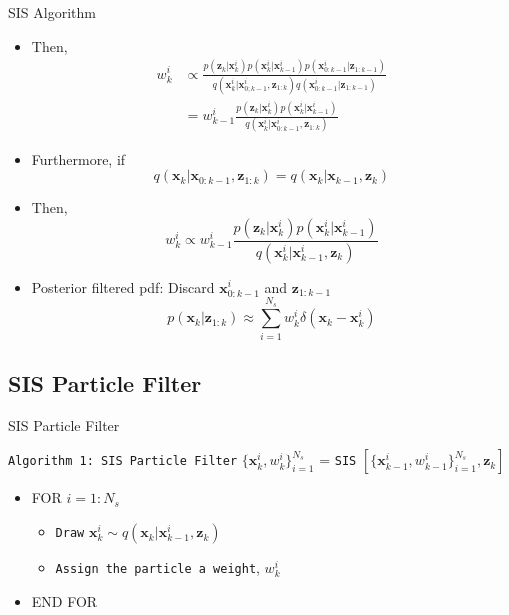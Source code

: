 \documentclass{beamer}
\newcommand{\x}{\mathbf{x}}
\newcommand{\z}{\mathbf{z}}
\begin{document}
\begin{frame}{SIS Algorithm}%
  \begin{itemize}
  	\item{Then,
    	\begin{align*}
        w_k^i &\propto 
        \frac{p(\z_k|\x_k^i)p(\x_k^i|\x_{k-1}^i) p(\x^i_{0:k-1}|\z_{1:k-1})}
        {q(\x_k^i | \x_{0;k-1}^{i}, \z_{1:k})q(\x_{0:k-1}^{i} | \z_{1:k-1})} \\
            &= w_{k-1}^{i} \frac{p(\z_k|\x_k^i)p(\x_k^i|\x_{k-1}^i)}
            {q(\x_k^i|\x_{0:k-1}^{i}, \z_{1:k})}
    	\end{align*}
   } 
   \item{ Furthermore, if	
    	$$
        	q(\x_k|\x_{0:k-1}, \z_{1:k}) = q(\x_k|\x_{k-1}, \z_k)
    	$$
   } 
   \item{Then,    
    	$$
        	w_k^i \propto w_{k-1}^{i} \frac{p(\z_k|\x_k^i)p(\x_k^i|\x_{k-1}^i)}
            {q(\x_k^i|\x_{k-1}^{i}, \z_{k})}
    	$$
    }
    \item{Posterior filtered pdf: Discard $\x_{0:k-1}^{i}$ and $\z_{1:k-1}$
    	$$
        	p(\x_k|\z_{1:k}) \approx \sum_{i=1}^{N_s}w_k^i\delta(\x_k - \x_k^i)
    	$$   
	  }
  \end{itemize}
\end{frame}

\subsection{SIS Particle Filter}
\begin{frame}{SIS Particle Filter}%

    \texttt{Algorithm 1: SIS Particle Filter}
    \newline
    $\{\x_k^i, w_k^i\}_{i=1}^{N_s}$ = \texttt{SIS}
    $[\{\x_{k-1}^i, w_{k-1}^i\}_{i=1}^{N_s},\z_k]$
    
    \begin{itemize}
        \item FOR $i=1:N_s$ 
            \begin{itemize}
                \item \texttt{Draw} $\x_k^i \sim q(\x_k|\x_{k-1}^i, \z_k)$
                \item \texttt{Assign the particle a weight}, $w_k^i$
            \end{itemize}
        \item END FOR
    \end{itemize}
\end{frame}
\end{document}
